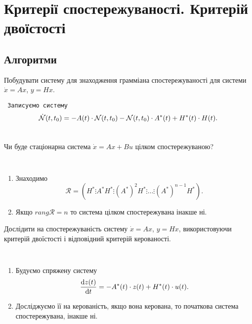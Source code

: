 
\section{Критерії спостережуваності. Критерій двоїстості}

\subsection{Алгоритми}

\begin{problem*}
    Побудувати систему для знаходження грамміана спостережуваності для системи $\dot x = A x$, $y = H x$.
\end{problem*}

\begin{algorithm} \tt
    Записуємо систему \[ \dot {\mathcal{N}}(t, t_0) = -A(t) \cdot \mathcal{N}(t, t_0) - \mathcal{N}(t, t_0) \cdot A^*(t) + H^*(t) \cdot H(t). \]
\end{algorithm}

\begin{problem*}
    Чи буде стаціонарна система $\dot x = A x + B u$ цілком спостережуваною?
\end{problem*}

\begin{algorithm} \tt 
    \begin{enumerate}
        \item Знаходимо \[ \mathcal{R} = \left(H^* \vdots A^* H^* \vdots (A^*)^2 H^* \vdots \ldots \vdots (A^*)^{n-1} H^*\right).\] 
        \item Якщо $rang \mathcal{R} = n$ то система цілком спостережувана інакше ні.
    \end{enumerate}
\end{algorithm}

\begin{problem*}
    Дослідити на спостережуваність систему $\dot x = A x$, $y = H x$, використовуючи критерій двоїстості і відповідний критерій керованості.
\end{problem*}

\begin{algorithm} \tt
    \begin{enumerate}
        \item Будуємо спряжену систему \[ \frac{\mathop{}\!\mathrm{d} z(t)}{\mathop{}\!\mathrm{d} t} = - A^*(t) \cdot z(t) + H^*(t) \cdot u(t). \]
        \item Досліджуємо її на керованість, якщо вона керована, то по\-чат\-ко\-ва \allowbreak сис\-те\-ма спостережувана, інакше ні.
    \end{enumerate}
\end{algorithm}

